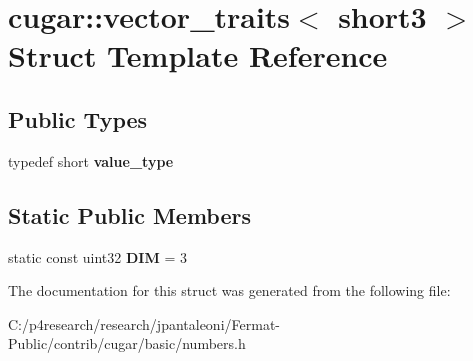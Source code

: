\hypertarget{structcugar_1_1vector__traits_3_01short3_01_4}{}\section{cugar\+:\+:vector\+\_\+traits$<$ short3 $>$ Struct Template Reference}
\label{structcugar_1_1vector__traits_3_01short3_01_4}
\subsection*{Public Types}
\begin{DoxyCompactItemize}
\item 
\mbox{\label{structcugar_1_1vector__traits_3_01short3_01_4_a11a6681662517f093a9c92539372177b}} 
typedef short {\bfseries value\+\_\+type}
\end{DoxyCompactItemize}
\subsection*{Static Public Members}
\begin{DoxyCompactItemize}
\item 
\mbox{\label{structcugar_1_1vector__traits_3_01short3_01_4_a9a20b5167f51b1f79ac89ef2f784566e}} 
static const uint32 {\bfseries D\+IM} = 3
\end{DoxyCompactItemize}


The documentation for this struct was generated from the following file\+:\begin{DoxyCompactItemize}
\item 
C\+:/p4research/research/jpantaleoni/\+Fermat-\/\+Public/contrib/cugar/basic/numbers.\+h\end{DoxyCompactItemize}
